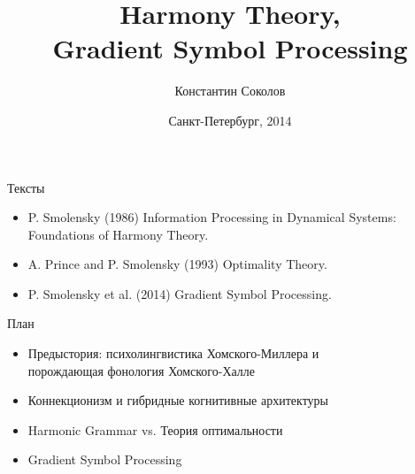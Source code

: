 \documentclass{beamer}
\begin{document}
\title{\Large{Harmony Theory, \\Gradient Symbol Processing}}
\author{Константин Соколов}
\date{Санкт-Петербург, 2014} 
\begin{frame}
    \thispagestyle{empty}
    \titlepage
\end{frame}

\begin{frame}{Тексты}
\setcounter{framenumber}{1}
\begin{itemize}
	\item P. Smolensky (1986) Information Processing in Dynamical Systems: Foundations of Harmony Theory.
    \medskip
    \item A. Prince and P. Smolensky (1993) Optimality Theory.
    \item P. Smolensky et al. (2014) Gradient Symbol Processing.
\end{itemize}
\end{frame}

\begin{frame}{План}
    \begin{itemize}
        \item Предыстория: психолингвистика Хомского-Миллера и \\порождающая фонология Хомского-Халле
        \medskip
        \item Коннекционизм и гибридные когнитивные архитектуры
        \medskip
        \item Harmonic Grammar vs. Теория оптимальности
        \medskip
        \item Gradient Symbol Processing
    \end{itemize}
\end{frame}
\end{document}
